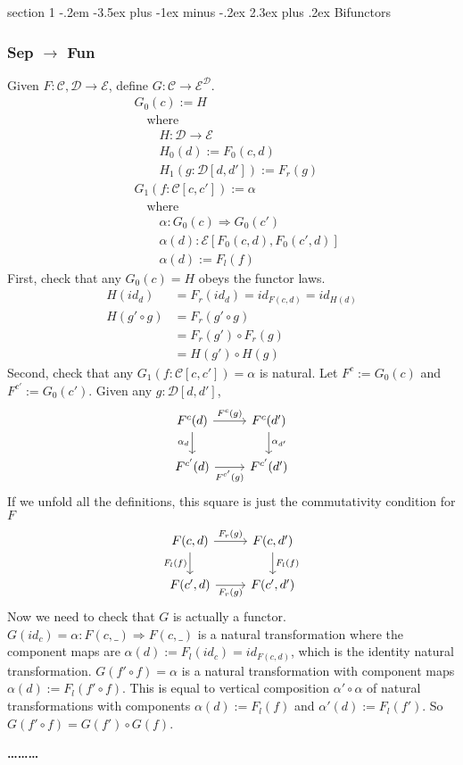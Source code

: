\documentclass[12pt]{article}
\makeatletter
\theoremstyle{definition}
\newenvironment{problem}{\@startsection
       {section}
       {1}
       {-.2em}
       {-3.5ex plus -1ex minus -.2ex}
       {2.3ex plus .2ex}
       {\pagebreak[3]%
       \large\bf\noindent{Problem }
       }
       }
       {%
       \begin{center}\large\bf \ldots\ldots\ldots\end{center}}
\newcommand{\cat}{\mathcal}
\makeatother
\begin{document}
\begin{problem}{Bifunctors}
\subsubsection*{Sep $\to$ Fun}
Given $F : \cat C , \cat D \to \cat E$, define $G : \cat C \to \cat E^{\cat D}$.
\begin{align*} 
    &G_0(c) := H\\
    &\quad \text{where}\\
    &\quad \quad H : \cat D \to \cat E\\
    &\quad \quad H_0(d) := F_0(c,d)\\
    &\quad \quad H_1(g : \cat D[d,d']) := F_r(g)\\
    &G_1(f : \cat C[c,c']) := \alpha\\
    &\quad \text{where}\\
    &\quad \quad \alpha : G_0(c) \Rightarrow G_0(c')\\
    &\quad \quad \alpha(d) : \cat E[F_0(c,d),F_0(c',d)]\\
    &\quad \quad \alpha(d) := F_l(f)
\end{align*}
First, check that any $G_0(c)= H$ obeys the functor laws.
\begin{align*} 
    H(id_d) &= F_r(id_d) = id_{F(c,d)} = id_{H(d)}\\
    H(g' \circ g) &= F_r(g' \circ g)\\
    &=F_r(g') \circ F_r(g)\\
    &=H(g') \circ H(g)
\end{align*}
Second, check that any $G_1(f : \cat C[c,c']) = \alpha$ is natural. Let $F^c := G_0(c)$ and $F^{c'} := G_0(c')$.
Given any $g : \cat D[d,d']$,
\[
\begin{tikzcd}
F^c(d) \arrow[r, "F^c(g)"] \arrow[d, "\alpha_d"'] & F^c(d') \arrow[d, "\alpha_{d'}"] \\
F^{c'}(d) \arrow[r, "F^{c'}(g)"'] & F^{c'}(d')
\end{tikzcd}
\]
If we unfold all the definitions, this square is just the commutativity condition for $F$
\[
\begin{tikzcd}
F(c,d) \arrow[r, "F_r(g)"] \arrow[d, "F_l(f)"'] & F(c,d') \arrow[d, "F_l(f)"] \\
F(c',d) \arrow[r, "F_r(g)"'] & F(c',d')
\end{tikzcd}
\]
Now we need to check that $G$ is actually a functor. $G(id_c)= \alpha : F(c,\_) \Rightarrow F(c,\_)$ is a natural transformation where the component maps are $\alpha(d):= F_l(id_c) = id_{F(c,d)}$, which is the identity natural transformation. $G(f' \circ f)= \alpha$ is a natural transformation with component maps $\alpha(d) := F_l(f' \circ f)$. This is equal to vertical composition $\alpha' \circ \alpha$ of natural transformations with components $\alpha(d) := F_l(f)$ and $\alpha'(d) := F_l(f')$. So $G(f' \circ f) = G(f') \circ G(f)$.



\end{problem}
\end{document}
